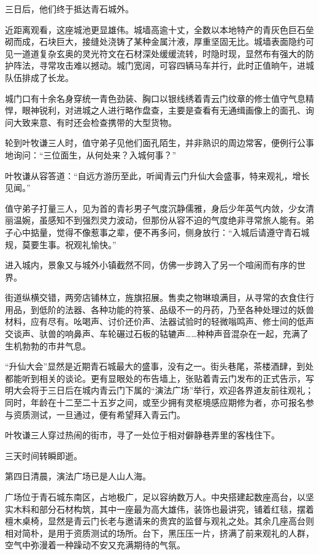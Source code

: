 三日后，他们终于抵达青石城外。

近距离观看，这座城池更显雄伟。城墙高逾十丈，全数以本地特产的青灰色巨石垒砌而成，石块巨大，接缝处浇铸了某种金属汁液，厚重坚固无比。城墙表面隐约可见一道道复杂玄奥的灵光符文在石材深处缓缓流转，时隐时现，显然布有强大的防护阵法，寻常攻击难以撼动。城门宽阔，可容四辆马车并行，此时正值晌午，进城队伍排成了长龙。

城门口有十余名身穿统一青色劲装、胸口以银线绣着青云门纹章的修士值守气息精悍，眼神锐利，对进城之人进行略作盘查，主要是查看有无通缉画像上的面孔、询问大致来意、有时还会检查携带的大型货物。

轮到叶牧谦三人时，值守弟子见他们面孔陌生，并非熟识的周边常客，便例行公事地询问：“三位面生，从何处来？入城何事？”

叶牧谦从容答道：“自远方游历至此，听闻青云门升仙大会盛事，特来观礼，增长见闻。”

值守弟子打量三人，见为首的青衫男子气度沉静儒雅，身后少年英气内敛，少女清丽温婉，虽感知不到强烈灵力波动，但那份从容不迫的气度绝非寻常旅人能有。弟子心中掂量，觉得不像惹事之辈，便不再多问，侧身放行：“入城后请遵守青石城规，莫要生事。祝观礼愉快。”

进入城内，景象又与城外小镇截然不同，仿佛一步跨入了另一个喧闹而有序的世界。

街道纵横交错，两旁店铺林立，旌旗招展。售卖之物琳琅满目，从寻常的衣食住行用品，到低阶的法器、各种功能的符箓、品级不一的丹药，乃至各种处理过的妖兽材料，应有尽有。吆喝声、讨价还价声、法器试验时的轻微嗡鸣声、修士间的低声交谈声、驮兽的响鼻声、车轮碾过石板的轱辘声……种种声音混杂在一起，充满了生机勃勃的市井气息。

“升仙大会”显然是近期青石城最大的盛事，没有之一。街头巷尾，茶楼酒肆，到处都能听到相关的谈论。更有显眼处的布告墙上，张贴着青云门发布的正式告示，写明大会将于三日后在城内青云门下属的“演法广场”举行，欢迎各界道友前往观礼；同时，年龄在十二至二十五岁之间，或至少拥有灵枢境感应期修为者，亦可报名参与资质测试，一旦通过，便有希望拜入青云门。

叶牧谦三人穿过热闹的街市，寻了一处位于相对僻静巷弄里的客栈住下。

三天时间转瞬即逝。

第四日清晨，演法广场已是人山人海。

广场位于青石城东南区，占地极广，足以容纳数万人。中央搭建起数座高台，以坚实木料和部分石材构筑，其中一座最为高大雄伟，装饰也最讲究，铺着红毯，摆着檀木桌椅，显然是青云门长老与邀请来的贵宾的监督与观礼之处。其余几座高台则相对简朴，是用于资质测试的场所。台下，黑压压一片，挤满了前来观礼的人群，空气中弥漫着一种躁动不安又充满期待的气氛。

